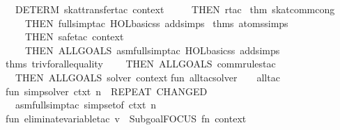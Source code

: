 \begin{isabellebody}
\ \ DETERM\ {}skat{}transfer{}tac\ context\ {}\isanewline
\ \ \ \ THEN\ rtac\ %
\isaantiq
thm\ skat{}comm{}cong{}%
\endisaantiq
\ {}\isanewline
\ \ \ \ THEN\ full{}simp{}tac\ {}HOL{}basic{}ss\ addsimps\ %
\isaantiq
thms\ atoms{}simps{}%
\endisaantiq
{}\ {}\isanewline
\ \ \ \ THEN\ safe{}tac\ context\isanewline
\ \ \ \ THEN\ ALLGOALS\ {}asm{}full{}simp{}tac\ {}HOL{}basic{}ss\ addsimps\ %
\isaantiq
thms\ triv{}forall{}equality{}%
\endisaantiq
{}{}\isanewline
\ \ \ \ THEN\ ALLGOALS\ {}comm{}rules{}tac{}{}\isanewline
\ \ THEN\ ALLGOALS\ {}solver\ context{}{}\isanewline
\isanewline
fun\ all{}tac{}solver\ {}\ {}\ {}\ all{}tac\isanewline
\isanewline
fun\ simp{}solver\ ctxt\ n\ {}\ REPEAT\ {}CHANGED\isanewline
\ \ {}asm{}full{}simp{}tac\ {}simpset{}of\ ctxt{}\ n\ {}{}\isanewline
\isanewline
fun\ eliminate{}variable{}tac\ v\ {}\ Subgoal{}FOCUS\ {}fn\ {}context{}\ {}{}{}{}\ {}{}\isanewline

\end{isabellebody}
